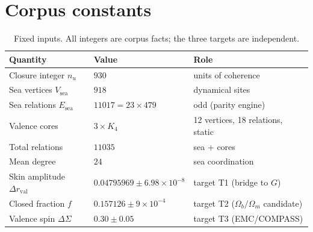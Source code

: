 \documentclass[11pt,a4paper]{article}
\newcommand{\Dr}{\Delta r_{\mathrm{val}}}
\newcommand{\Esea}{E_{\mathrm{sea}}}
\newcommand{\Vsea}{V_{\mathrm{sea}}}
\begin{document}
\section{Corpus constants}
\begin{table}[h]
\centering\small
\begin{tabular}{lll}
\toprule
Quantity & Value & Role\\
\midrule
Closure integer $n_u$ & $930$ & units of coherence \\
Sea vertices $\Vsea$ & $918$ & dynamical sites \\
Sea relations $\Esea$ & $11017 = 23 \times 479$ & odd (parity engine) \\
Valence cores & $3 \times K_4$ & 12 vertices, 18 relations, static \\
Total relations & $11035$ & sea + cores \\
Mean degree & $24$ & sea coordination \\
Skin amplitude $\Dr$ & $0.04795969 \pm 6.98\times10^{-8}$ & target T1 (bridge to $G$) \\
Closed fraction $f$ & $0.157126 \pm 9\times10^{-4}$ & target T2 ($\Omega_b/\Omega_m$ candidate) \\
Valence spin $\Delta\Sigma$ & $0.30 \pm 0.05$ & target T3 (EMC/COMPASS) \\
\bottomrule
\end{tabular}
\caption{Fixed inputs. All integers are corpus facts; the three targets are independent.}
\end{table}
\end{document}
